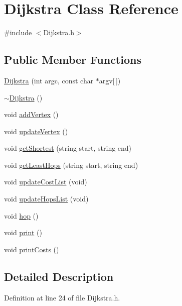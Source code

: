 \hypertarget{class_dijkstra}{}\section{Dijkstra Class Reference}
\label{class_dijkstra}


{\ttfamily \#include $<$Dijkstra.\+h$>$}

\subsection*{Public Member Functions}
\begin{DoxyCompactItemize}
\item 
\hyperlink{class_dijkstra_a4801fe92d831b278afe52d4cf2737e11}{Dijkstra} (int argc, const char $\ast$argv\mbox{[}$\,$\mbox{]})
\item 
\hyperlink{class_dijkstra_a5f4a99a63b92805a304dea947ac69db5}{$\sim$\+Dijkstra} ()
\item 
void \hyperlink{class_dijkstra_a691d2d0786a2e5afd65e2e4a0098001c}{add\+Vertex} ()
\item 
void \hyperlink{class_dijkstra_a557103eb938f891cbd097eadccfb4a1e}{update\+Vertex} ()
\item 
void \hyperlink{class_dijkstra_a0c3e812aec28fe039078f121df8db504}{get\+Shortest} (string start, string end)
\item 
void \hyperlink{class_dijkstra_a5ec5a3d6e77d515aeeaec19f732578f3}{get\+Least\+Hops} (string start, string end)
\item 
void \hyperlink{class_dijkstra_a5c6ca73a2ae0ea89357977bab48d4ad0}{update\+Cost\+List} (void)
\item 
void \hyperlink{class_dijkstra_abc9a269f8d4d0effa15b86b3d8a5a8c5}{update\+Hops\+List} (void)
\item 
void \hyperlink{class_dijkstra_ab25823d21e465e4d762c006bf4bb8da7}{hop} ()
\item 
void \hyperlink{class_dijkstra_aa41d80c91c1d233a9c3eeb0a19358f68}{print} ()
\item 
void \hyperlink{class_dijkstra_a5784f6df6bb4abfff5a54eb8bade34d9}{print\+Costs} ()
\end{DoxyCompactItemize}


\subsection{Detailed Description}


Definition at line 24 of file Dijkstra.\+h.



